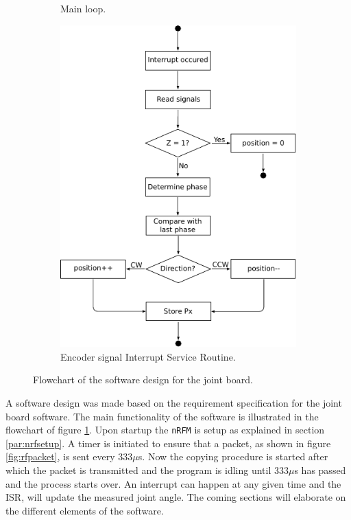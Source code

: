 \begin{figure}[h]
\begin{subfigure}[b]{0.30\textwidth}
		\caption{Main loop.}
		\label{sfig:joint_main_flowchart}
	\end{subfigure}
	\begin{subfigure}[b]{0.69\textwidth}
		\centering
		\includegraphics[width=.8\linewidth]{graphics/joint_interrupt}
		\caption{Encoder signal Interrupt Service Routine.}
		\label{sfig:joint_interrupt}
	\end{subfigure}
	\caption{Flowchart of the software design for the joint board.}
	\label{fig:joint_software}
\end{figure}
A software design was made based on the requirement specification for the joint board software.
The main functionality of the software is illustrated in the flowchart of figure \ref{sfig:joint_main_flowchart}.
Upon startup the \texttt{nRFM} is setup as explained in section \ref{par:nrfsetup}.
A timer is initiated to ensure that a packet, as shown in figure \ref{fig:rfpacket}, is sent every 333$\mu$s.
Now the copying procedure is started after which the packet is transmitted and the program is idling until 333$\mu$s has passed and the process starts over.
An interrupt can happen at any given time and the ISR, will update the measured joint angle. 
The coming sections will elaborate on the different elements of the software.

